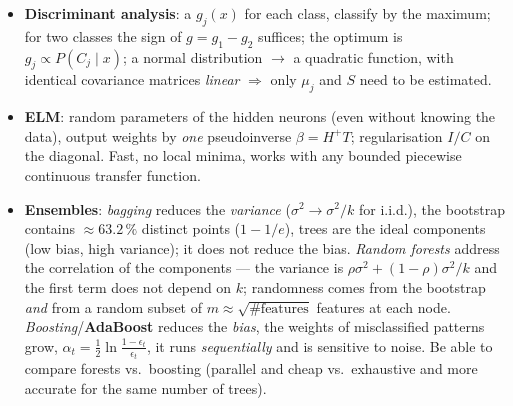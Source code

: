 \documentclass[11pt,a4paper]{article}
\theoremstyle{definition}
\begin{document}
\begin{itemize}
      $\Delta\beta_j=\eta\sum_i(y_i-\sigma(z_i))x_{ij}$.
\item \textbf{Discriminant analysis}: a $g_j(x)$ for each class, classify by the maximum; for two
      classes the sign of $g=g_1-g_2$ suffices; the optimum is $g_j\propto P(C_j\mid x)$; a normal
      distribution $\to$ a quadratic function, with identical covariance matrices \emph{linear}
      $\Rightarrow$ only $\mu_j$ and $S$ need to be estimated.
\item \textbf{ELM}: random parameters of the hidden neurons (even without knowing the data), output
      weights by \emph{one} pseudoinverse $\beta=H^{+}T$; regularisation $I/C$ on the diagonal.
      Fast, no local minima, works with any bounded piecewise continuous transfer function.
\item \textbf{Ensembles}: \emph{bagging} reduces the \emph{variance} ($\sigma^2\to\sigma^2/k$ for
      i.i.d.), the bootstrap contains $\approx 63.2\,\%$ distinct points ($1-1/e$), trees are the
      ideal components (low bias, high variance); it does not reduce the bias. \emph{Random
      forests} address the correlation of the components --- the variance is
      $\rho\sigma^2+(1-\rho)\sigma^2/k$ and the first term does not depend on $k$; randomness comes
      from the bootstrap \emph{and} from a random subset of $m\approx\sqrt{\#\text{features}}$
      features at each node. \emph{Boosting}/\textbf{AdaBoost} reduces the \emph{bias}, the weights
      of misclassified patterns grow, $\alpha_t=\frac12\ln\frac{1-\epsilon_t}{\epsilon_t}$, it runs
      \emph{sequentially} and is sensitive to noise. Be able to compare forests vs.\ boosting
      (parallel and cheap vs.\ exhaustive and more accurate for the same number of trees).
\end{itemize}
\end{document}
